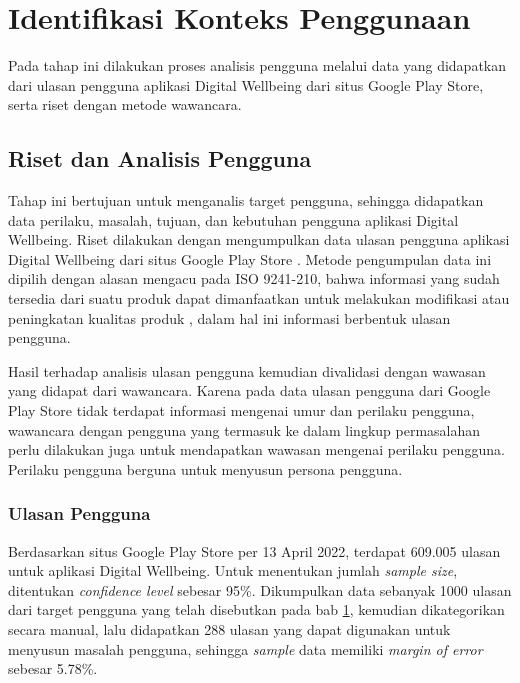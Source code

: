 \section{Identifikasi Konteks Penggunaan}
\label{sec:identifikasi_konteks_penggunaan}

Pada tahap ini dilakukan proses analisis pengguna melalui data yang didapatkan dari ulasan pengguna aplikasi Digital Wellbeing dari situs Google Play Store, serta riset dengan metode wawancara.

\subsection{Riset dan Analisis Pengguna}
\label{subsec:riset_analisis}

Tahap ini bertujuan untuk menganalis target pengguna, sehingga didapatkan data perilaku, masalah, tujuan, dan kebutuhan pengguna aplikasi Digital Wellbeing. Riset dilakukan dengan mengumpulkan data ulasan pengguna aplikasi Digital Wellbeing dari situs Google Play Store \textcite{dwplaystorereviews}. Metode pengumpulan data ini dipilih dengan alasan mengacu pada ISO 9241-210, bahwa informasi yang sudah tersedia dari suatu produk dapat dimanfaatkan untuk melakukan modifikasi atau peningkatan kualitas produk \parencite{iso9241-210:2010}, dalam hal ini informasi berbentuk ulasan pengguna.

Hasil terhadap analisis ulasan pengguna kemudian divalidasi dengan wawasan yang didapat dari wawancara. Karena pada data ulasan pengguna dari Google Play Store tidak terdapat informasi mengenai umur dan perilaku pengguna, wawancara dengan pengguna yang termasuk ke dalam lingkup permasalahan perlu dilakukan juga untuk mendapatkan wawasan mengenai perilaku pengguna. Perilaku pengguna berguna untuk menyusun persona pengguna.

\subsubsection{Ulasan Pengguna}
\label{subsubsec:ulasan_pengguna}

Berdasarkan situs Google Play Store per 13 April 2022, terdapat 609.005 ulasan untuk aplikasi Digital Wellbeing. Untuk menentukan jumlah \textit{sample size}, ditentukan \textit{confidence level} sebesar 95\%. Dikumpulkan data sebanyak 1000 ulasan dari target pengguna yang telah disebutkan pada bab \ref{sec:identifikasi_konteks_penggunaan},  kemudian dikategorikan secara manual, lalu didapatkan 288 ulasan yang dapat digunakan untuk menyusun masalah pengguna, sehingga \textit{sample} data memiliki \textit{margin of error} sebesar 5.78\%.

